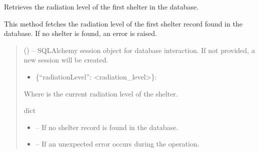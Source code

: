 \documentclass[letterpaper,10pt,english]{sphinxmanual}
\begin{document}
\begin{fulllineitems}
\begin{fulllineitems}
\label{\detokenize{app.controllers:app.controllers.shelter_controller.ShelterController.get_shelter_radiation_level}}
\pysigstartsignatures
\pysiglinewithargsret
{}
{}
{}
\pysigstopsignatures
\sphinxAtStartPar
Retrieves the radiation level of the first shelter in the database.

\sphinxAtStartPar
This method fetches the radiation level of the first shelter record found in the database.
If no shelter is found, an error is raised.
\begin{quote}\begin{description}
\sphinxAtStartPar
{} (\sphinxstyleliteralemphasis{\sphinxupquote{, }}) – SQLAlchemy session object for database interaction.
If not provided, a new session will be created.

\sphinxAtStartPar
\begin{description}
\begin{itemize}
\item {} 
\sphinxAtStartPar
\{“radiationLevel”: <radiation\_level>\}:

\end{itemize}

\sphinxAtStartPar
Where  is the current radiation level of the shelter.

\end{description}


\sphinxAtStartPar
dict

\begin{itemize}
\item {} 
\sphinxAtStartPar
{} – If no shelter record is found in the database.

\item {} 
\sphinxAtStartPar
{} – If an unexpected error occurs during the operation.

\end{itemize}


\end{description}
\end{quote}
\end{fulllineitems}
\end{fulllineitems}
\end{document}
